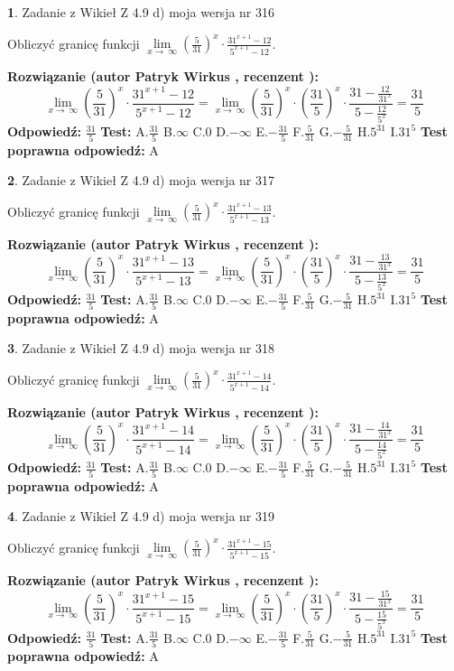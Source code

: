 \documentclass[12pt, a4paper]{article}
\theoremstyle{definition} %
\newtheorem{zad}{}
\newcommand{\zadStart}[1]{\begin{zad}#1\newline}
\newcommand{\zadStop}{\end{zad}}
\newcommand{\rozwStart}[2]{\noindent \textbf{Rozwiązanie (autor #1 , recenzent #2): }\newline}
\newcommand{\rozwStop}{\newline}
\newcommand{\odpStart}{\noindent \textbf{Odpowiedź:}\newline}
\newcommand{\odpStop}{\newline}
\newcommand{\testStart}{\noindent \textbf{Test:}\newline}
\newcommand{\testStop}{\newline}
\newcommand{\kluczStart}{\noindent \textbf{Test poprawna odpowiedź:}\newline}
\newcommand{\kluczStop}{\newline}
\begin{document}
\zadStart{Zadanie z Wikieł Z 4.9 d) moja wersja nr 316}


Obliczyć granicę funkcji  $\lim\limits_{x\to\ \infty}(\frac{5}{31})^{x}\cdot\frac{31^{x+1}-12}{5^{x+1}-12}$.
\zadStop
\rozwStart{Patryk Wirkus}{}
$$\lim\limits_{x\to\ \infty}(\frac{5}{31})^{x}\cdot\frac{31^{x+1}-12}{5^{x+1}-12}=\lim\limits_{x\to\ \infty}(\frac{5}{31})^{x}\cdot(\frac{31}{5})^{x} \cdot \frac{31-\frac{12}{31^{x}}}{5-\frac{12}{5^{x}}} = \frac{31}{5}$$
\rozwStop
\odpStart
$\frac{31}{5}$
\odpStop
\testStart
A.$\frac{31}{5}$ B.$\infty$ C.$0$ D.$-\infty$ E.$-\frac{31}{5}$
F.$\frac{5}{31}$ G.$-\frac{5}{31}$
H.$5^{31}$
I.$31^{5}$
\testStop
\kluczStart
A
\kluczStop



\zadStart{Zadanie z Wikieł Z 4.9 d) moja wersja nr 317}


Obliczyć granicę funkcji  $\lim\limits_{x\to\ \infty}(\frac{5}{31})^{x}\cdot\frac{31^{x+1}-13}{5^{x+1}-13}$.
\zadStop
\rozwStart{Patryk Wirkus}{}
$$\lim\limits_{x\to\ \infty}(\frac{5}{31})^{x}\cdot\frac{31^{x+1}-13}{5^{x+1}-13}=\lim\limits_{x\to\ \infty}(\frac{5}{31})^{x}\cdot(\frac{31}{5})^{x} \cdot \frac{31-\frac{13}{31^{x}}}{5-\frac{13}{5^{x}}} = \frac{31}{5}$$
\rozwStop
\odpStart
$\frac{31}{5}$
\odpStop
\testStart
A.$\frac{31}{5}$ B.$\infty$ C.$0$ D.$-\infty$ E.$-\frac{31}{5}$
F.$\frac{5}{31}$ G.$-\frac{5}{31}$
H.$5^{31}$
I.$31^{5}$
\testStop
\kluczStart
A
\kluczStop



\zadStart{Zadanie z Wikieł Z 4.9 d) moja wersja nr 318}


Obliczyć granicę funkcji  $\lim\limits_{x\to\ \infty}(\frac{5}{31})^{x}\cdot\frac{31^{x+1}-14}{5^{x+1}-14}$.
\zadStop
\rozwStart{Patryk Wirkus}{}
$$\lim\limits_{x\to\ \infty}(\frac{5}{31})^{x}\cdot\frac{31^{x+1}-14}{5^{x+1}-14}=\lim\limits_{x\to\ \infty}(\frac{5}{31})^{x}\cdot(\frac{31}{5})^{x} \cdot \frac{31-\frac{14}{31^{x}}}{5-\frac{14}{5^{x}}} = \frac{31}{5}$$
\rozwStop
\odpStart
$\frac{31}{5}$
\odpStop
\testStart
A.$\frac{31}{5}$ B.$\infty$ C.$0$ D.$-\infty$ E.$-\frac{31}{5}$
F.$\frac{5}{31}$ G.$-\frac{5}{31}$
H.$5^{31}$
I.$31^{5}$
\testStop
\kluczStart
A
\kluczStop



\zadStart{Zadanie z Wikieł Z 4.9 d) moja wersja nr 319}


Obliczyć granicę funkcji  $\lim\limits_{x\to\ \infty}(\frac{5}{31})^{x}\cdot\frac{31^{x+1}-15}{5^{x+1}-15}$.
\zadStop
\rozwStart{Patryk Wirkus}{}
$$\lim\limits_{x\to\ \infty}(\frac{5}{31})^{x}\cdot\frac{31^{x+1}-15}{5^{x+1}-15}=\lim\limits_{x\to\ \infty}(\frac{5}{31})^{x}\cdot(\frac{31}{5})^{x} \cdot \frac{31-\frac{15}{31^{x}}}{5-\frac{15}{5^{x}}} = \frac{31}{5}$$
\rozwStop
\odpStart
$\frac{31}{5}$
\odpStop
\testStart
A.$\frac{31}{5}$ B.$\infty$ C.$0$ D.$-\infty$ E.$-\frac{31}{5}$
F.$\frac{5}{31}$ G.$-\frac{5}{31}$
H.$5^{31}$
I.$31^{5}$
\testStop
\kluczStart
A
\kluczStop
\end{document}

